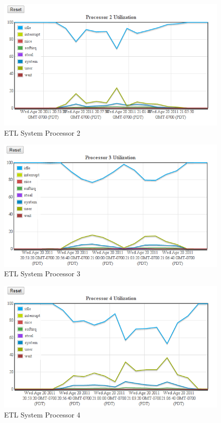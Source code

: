 \documentclass[twocolumn,letterpaper]{article}
\begin{document}
\begin{figure}[ht]
  \begin{center}
    \includegraphics[scale=0.37]{collectd-c10-cpu-02}
  \end{center}
  \caption{ETL System Processor 2}
\end{figure}

\begin{figure}[ht]
  \begin{center}
    \includegraphics[scale=0.37]{collectd-c10-cpu-03}
  \end{center}
  \caption{ETL System Processor 3}
\end{figure}

\begin{figure}[ht]
  \begin{center}
    \includegraphics[scale=0.37]{collectd-c10-cpu-04}
  \end{center}
  \caption{ETL System Processor 4}
\end{figure}
\end{document}
